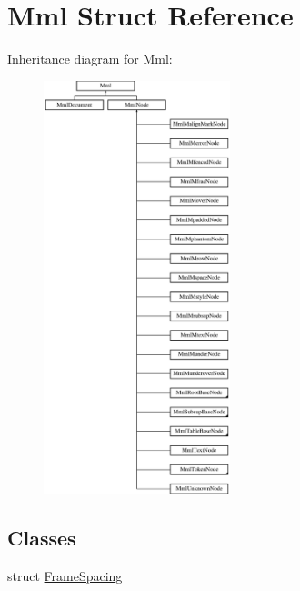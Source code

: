 \hypertarget{struct_mml}{}\section{Mml Struct Reference}
\label{struct_mml}
Inheritance diagram for Mml\+:\begin{figure}[H]
\begin{center}
\leavevmode
\includegraphics[height=12.000000cm]{struct_mml}
\end{center}
\end{figure}
\subsection*{Classes}
\begin{DoxyCompactItemize}
\item 
struct \mbox{\hyperlink{struct_mml_1_1_frame_spacing}{Frame\+Spacing}}
\end{DoxyCompactItemize}
